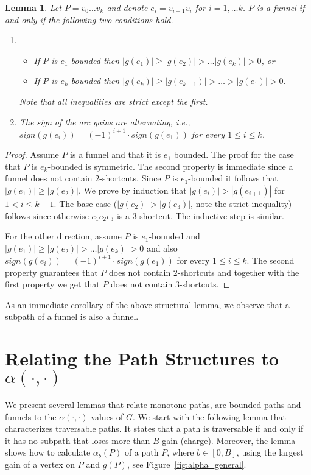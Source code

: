 \documentclass[11pt]{article}
\newtheorem{lemma}[theorem]{Lemma}
\begin{document}
\begin{lemma}\label{lemma:funnel-zigzag-structure}
    Let $P = v_0 \ldots v_k$ and denote $e_i =  v_{i-1}v_i$ for $i=1,\ldots k$.  $P$ is a funnel if and only if the following two conditions hold.
    \begin{enumerate}
        \item 
        \begin{itemize}
        \item If $P$ is $e_1$-bounded then $|g(e_1)|\ge|g(e_2)| > \ldots |g(e_{k})|>0$, or
        \item If $P$ is $e_{k}$-bounded then $|g(e_{k})| \ge |g(e_{k-1})| > \ldots > |g(e_1)| > 0$.
    \end{itemize}
    Note that all inequalities are strict except the first.
    \item The sign of the arc gains are alternating, i.e., $sign(g(e_i)) = (-1)^{i+1}\cdot sign(g(e_1))$ for
    every $1\le i \le k$.
    \end{enumerate}
\end{lemma}

\begin{proof}
    Assume $P$ is a funnel and that it is $e_1$ bounded.
    The proof for the case that $P$ is $e_{k}$-bounded is symmetric.
    The second property is immediate since a funnel does not contain $2$-shortcuts. Since $P$ is $e_1$-bounded it follows that $|g(e_1)| \ge |g(e_2)|$. We prove by induction that $|g(e_i)| > |g(e_{i+1})|$ for $1<i\le k-1$. The base case ($|g(e_2)| > |g(e_3)|$, note the strict inequality) follows since otherwise $e_1e_2e_3$ is a $3$-shortcut.  The inductive step is similar. 

    For the other direction, assume $P$ is $e_1$-bounded and $|g(e_1)|\ge|g(e_2)| > \ldots |g(e_{k})| > 0$ and also  $sign(g(e_i)) = (-1)^{i+1}\cdot sign(g(e_1))$ for every $1\le i\le k$. The second property guarantees that $P$ does not contain $2$-shortcuts and together with the first property we get that $P$ does not contain $3$-shortcuts. 
\end{proof}

As an immediate corollary of the above structural lemma, we observe that a subpath of a funnel is also a funnel.


\section{Relating the Path Structures to \texorpdfstring{$\alpha(\cdot, \cdot)$}{Alpha(.,.)}}
We present several lemmas that relate monotone paths, arc-bounded paths and funnels to the $\alpha(\cdot,\cdot)$ values of $G$. We start with the following lemma that characterizes traversable paths. It states that a path is traversable if and only if it has no subpath that loses more than $B$ gain (charge). Moreover, the lemma shows how to calculate $\alpha_b(P)$ of a path $P$, where $b\in [0,B]$, using the largest gain of a vertex on $P$ and $g(P)$, see Figure~\ref{fig:alpha_general}.
\end{document}
